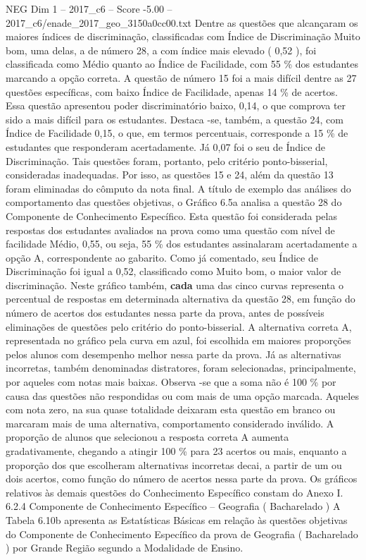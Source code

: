 \begin{textsample}{NEG Dim 1 – 2017\_c6 – Score -5.00 – 2017\_c6/enade\_2017\_geo\_3150a0cc00.txt}
Dentre as questões que alcançaram os maiores índices de discriminação, classificadas com Índice de Discriminação Muito bom, uma delas, a de número 28, a com índice mais elevado ( 0,52 ), foi classificada como Médio quanto ao Índice de Facilidade, com 55 \% dos estudantes marcando a opção correta.
A questão de número 15 foi a mais difícil dentre as 27 questões específicas, com baixo Índice de Facilidade, apenas 14 \% de acertos.
Essa questão apresentou poder discriminatório baixo, 0,14, o que comprova ter sido a mais difícil para os estudantes.
Destaca -se, também, a questão 24, com Índice de Facilidade 0,15, o que, em termos percentuais, corresponde a 15 \% de estudantes que responderam acertadamente.
Já 0,07 foi o seu de Índice de Discriminação.
Tais questões foram, portanto, pelo critério ponto-bisserial, consideradas inadequadas.
Por isso, as questões 15 e 24, além da questão 13 foram eliminadas do cômputo da nota final.
A título de exemplo das análises do comportamento das questões objetivas, o Gráfico 6.5a analisa a questão 28 do Componente de Conhecimento Específico.
Esta questão foi considerada pelas respostas dos estudantes avaliados na prova como uma questão com nível de facilidade Médio, 0,55, ou seja, 55 \% dos estudantes assinalaram acertadamente a opção A, correspondente ao gabarito.
Como já comentado, seu Índice de Discriminação foi igual a 0,52, classificado como Muito bom, o maior valor de discriminação.
Neste gráfico também, \textbf{cada} uma das cinco curvas representa o percentual de respostas em determinada alternativa da questão 28, em função do número de acertos dos estudantes nessa parte da prova, antes de possíveis eliminações de questões pelo critério do ponto-bisserial.
A alternativa correta A, representada no gráfico pela curva em azul, foi escolhida em maiores proporções pelos alunos com desempenho melhor nessa parte da prova.
Já as alternativas incorretas, também denominadas distratores, foram selecionadas, principalmente, por aqueles com notas mais baixas.
Observa -se que a soma não é 100 \% por causa das questões não respondidas ou com mais de uma opção marcada.
Aqueles com nota zero, na sua quase totalidade deixaram esta questão em branco ou marcaram mais de uma alternativa, comportamento considerado inválido.
A proporção de alunos que selecionou a resposta correta A aumenta gradativamente, chegando a atingir 100 \% para 23 acertos ou mais, enquanto a proporção dos que escolheram alternativas incorretas decai, a partir de um ou dois acertos, como função do número de acertos nessa parte da prova.
Os gráficos relativos às demais questões do Conhecimento Específico constam do Anexo I. 6.2.4 Componente de Conhecimento Específico – Geografia ( Bacharelado ) A Tabela 6.10b apresenta as Estatísticas Básicas em relação às questões objetivas do Componente de Conhecimento Específico da prova de Geografia ( Bacharelado ) por Grande Região segundo a Modalidade de Ensino.

\end{textsample}

